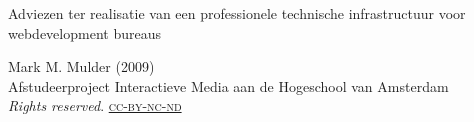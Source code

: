 \thispagestyle{empty}

\begin{flushleft}

  \Huge
  Adviezen ter realisatie van een professionele technische infrastructuur voor webdevelopment bureaus\\

  \vfill{}
  
  \small
  Mark M. Mulder (2009) \\
  Afstudeerproject Interactieve Media aan de Hogeschool van Amsterdam
  \\\emph{Rights reserved}.  \href{http://creativecommons.org/licenses/by-nc-nd/3.0/nl/}{\textsc{cc-by-nc-nd}}
  
\end{flushleft}

\normalsize
